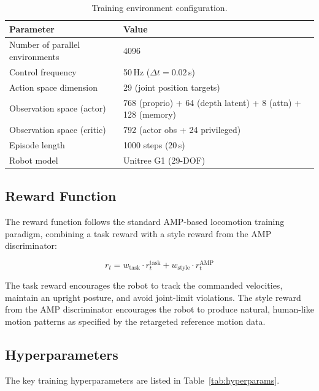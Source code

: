 \begin{table}[t]
\centering
\caption{Training environment configuration.}
\label{tab:env_config}
\footnotesize
\begin{tabular}{@{}p{4.5cm}p{8cm}@{}}
\toprule
\textbf{Parameter} & \textbf{Value} \\
\midrule
Number of parallel environments & 4096 \\
Control frequency & 50\,Hz ($\Delta t = 0.02$\,s) \\
Action space dimension & 29 (joint position targets) \\
Observation space (actor) & 768 (proprio) + 64 (depth latent) + 8 (attn) + 128 (memory) \\
Observation space (critic) & 792 (actor obs + 24 privileged) \\
Episode length & 1000 steps (20\,s) \\
Robot model & Unitree G1 (29-DOF) \\
\bottomrule
\end{tabular}
\end{table}

\subsection{Reward Function}
\label{sec:ch6_reward_function}

The reward function follows the standard AMP-based locomotion training paradigm, combining a task reward with a style reward from the AMP discriminator:

\begin{equation}
    r_t = w_{\text{task}} \cdot r_t^{\text{task}} + w_{\text{style}} \cdot r_t^{\text{AMP}}
\end{equation}

The task reward encourages the robot to track the commanded velocities, maintain an upright posture, and avoid joint-limit violations. The style reward from the AMP discriminator encourages the robot to produce natural, human-like motion patterns as specified by the retargeted reference motion data.

\subsection{Hyperparameters}
\label{sec:hyperparameters}

The key training hyperparameters are listed in Table~\ref{tab:hyperparams}.

